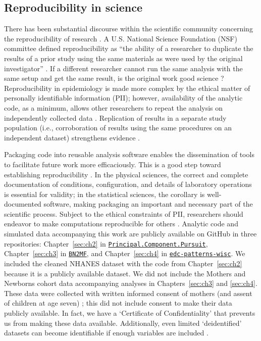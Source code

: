 \subsection{Reproducibility in science}\label{sec:repro}
There has been substantial discourse within the scientific community concerning the reproducibility of research \citep{baker20161}. A U.S. National Science Foundation (NSF) committee defined reproducibility as ``the ability of a researcher to duplicate the results of a prior study using the same materials as were used by the original investigator'' \citep{cacioppo2015social}. If a different researcher cannot run the same analysis with the same setup and get the same result, is the original work good science \citep{goodman2016does}? Reproducibility in epidemiology is made more complex by the ethical matter of personally identifiable information (PII); however, availability of the analytic code, as a minimum, allows other researchers to repeat the analysis on independently collected data \citep{peng2011reproducible}. Replication of results in a separate study population (i.e., corroboration of results using the same procedures on an independent dataset) strengthens evidence \citep{peng2006reproducible}.

Packaging code into reusable analysis software enables the dissemination of tools to facilitate future work more efficaciously. This is a good step toward establishing reproducibility \citep{collberg2015repeatability}. In the physical sciences, the correct and complete documentation of conditions, configuration, and details of laboratory operations is essential for validity; in the statistical sciences, the corollary is well-documented software, making packaging an important and necessary part of the scientific process. Subject to the ethical constraints of PII, researchers should endeavor to make computations reproducible for others \citep{barnes2010publish}. Analytic code and simulated data accompanying this work are publicly available on GitHub in three repositories: Chapter~\ref{sec:ch2} in \texttt{\href{https://github.com/lizzyagibson/Principal.Component.Pursuit}{Principal.Component.Pursuit}}, Chapter~\ref{sec:ch3} in \texttt{\href{https://github.com/lizzyagibson/BN2MF}{BN2MF}}, and Chapter~\ref{sec:ch4} in \texttt{\href{https://github.com/lizzyagibson/edc-patterns-wisc}{edc-patterns-wisc}}. We included the cleaned NHANES dataset with the code from Chapter~\ref{sec:ch2} because it is a publicly available dataset. We did not include the Mothers and Newborns cohort data accompanying analyses in Chapters~\ref{sec:ch3} and \ref{sec:ch4}. These data were collected with written informed consent of mothers (and assent of children at age seven) \citep{perera03}; this did not include consent to make their data publicly available. In fact, we have a `Certificate of Confidentiality' that prevents us from making these data available. Additionally, even limited `deidentified' datasets can become identifiable if enough variables are included \citep{narayanan2008robust}.

